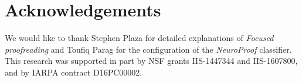 
\section*{Acknowledgements}
We would like to thank Stephen Plaza for detailed explanations of \emph{Focused proofreading} and Toufiq Parag for the configuration of the \emph{NeuroProof} classifier. This research was supported in part by NSF grants IIS-1447344 and IIS-1607800, and by IARPA contract D16PC00002.

